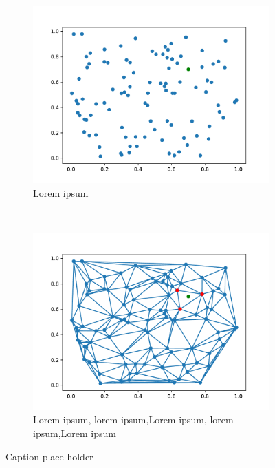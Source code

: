 \begin{figure}[h] %
	\centering
	\begin{subfigure}[t]{0.5\textwidth}
		\centering
		\includegraphics[width=\linewidth]{images/vis2d1.pdf}
		\caption{Lorem ipsum}
	\label{fig:3dinterpolate-1}
	\end{subfigure}%
	~ 
	\begin{subfigure}[t]{0.5\textwidth}
		\centering
		\includegraphics[width=\linewidth]{images/vis2d2.pdf}
		\caption{Lorem ipsum, lorem ipsum,Lorem ipsum, lorem ipsum,Lorem ipsum}
		\label{fig:3dinterpolate-2}
	\end{subfigure}
	\caption{Caption place holder}

\end{figure}

